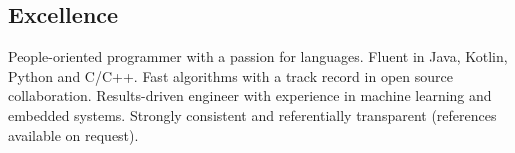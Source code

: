 \documentclass[letterpaper,11pt]{article}
\newcommand{\resumeItem}[2]{
  \item\small{\textbf{#1}{ #2 }}
}
\newcommand{\resumeSubItem}[2]{\resumeItem{#1}{#2}}
\newcommand{\resumeSubHeadingListStart}{\begin{itemize}[leftmargin=*]}
\newcommand{\resumeSubHeadingListEnd}{\end{itemize}}
\begin{document}
\begin{justify}
%

\section{Excellence}
People-oriented programmer with a passion for languages. Fluent in Java, Kotlin, Python and C/C++. Fast algorithms with a track record in open source collaboration. Results-driven engineer with experience in machine learning and embedded systems. Strongly consistent and referentially transparent (references available on request).
\end{justify}
\end{document}
